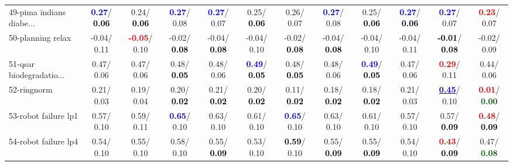 \begin{table}[h]
\begin{center}
{\begin{tabular}{lc|c|c|c|c|c|c|c|c|c|c}
49-pima indians diabe... & \textcolor{blue}{\textbf{  0.27}}/\textcolor{black}{\textbf{  0.06}} &   0.24/\textcolor{black}{\textbf{  0.06}} & \textcolor{blue}{\textbf{  0.27}}/  0.08 & \textcolor{blue}{\textbf{  0.27}}/  0.07 &   0.25/\textcolor{black}{\textbf{  0.06}} &   0.26/  0.07 & \textcolor{blue}{\textbf{  0.27}}/  0.08 &   0.25/\textcolor{black}{\textbf{  0.06}} & \textcolor{blue}{\textbf{  0.27}}/\textcolor{black}{\textbf{  0.06}} & \textcolor{blue}{\textbf{  0.27}}/  0.07 & \textcolor{red}{\textbf{  0.23}}/  0.07 \\
50-planning relax &  -0.04/  0.11 & \textcolor{red}{\textbf{ -0.05}}/  0.10 &  -0.02/\textcolor{black}{\textbf{  0.08}} &  -0.04/\textcolor{black}{\textbf{  0.08}} &  -0.04/  0.10 &  -0.02/\textcolor{black}{\textbf{  0.08}} &  -0.04/\textcolor{black}{\textbf{  0.08}} &  -0.04/  0.10 &  -0.04/  0.11 & \textcolor{black}{\textbf{ -0.01}}/\textcolor{black}{\textbf{  0.08}} &  -0.02/  0.09 \\
51-qsar biodegradatio... &   0.47/  0.06 &   0.47/  0.06 &   0.48/\textcolor{black}{\textbf{  0.05}} &   0.48/  0.06 & \textcolor{blue}{\textbf{  0.49}}/\textcolor{black}{\textbf{  0.05}} &   0.48/\textcolor{black}{\textbf{  0.05}} &   0.48/  0.06 & \textcolor{blue}{\textbf{  0.49}}/\textcolor{black}{\textbf{  0.05}} &   0.47/  0.06 & \textcolor{red}{\textbf{  0.29}}/  0.11 &   0.44/  0.06 \\
52-ringnorm &   0.21/  0.03 &   0.19/  0.04 &   0.20/\textcolor{black}{\textbf{  0.02}} &   0.21/\textcolor{black}{\textbf{  0.02}} &   0.20/\textcolor{black}{\textbf{  0.02}} &   0.11/\textcolor{black}{\textbf{  0.02}} &   0.18/\textcolor{black}{\textbf{  0.02}} &   0.18/\textcolor{black}{\textbf{  0.02}} &   0.21/  0.03 & \underline{\textcolor{blue}{\textbf{  0.45}}}/  0.10 & \textcolor{red}{\textbf{  0.01}}/\textcolor{darkgreen}{\textbf{  0.00}} \\
53-robot failure lp1 &   0.57/  0.10 &   0.59/  0.11 & \textcolor{blue}{\textbf{  0.65}}/  0.10 &   0.63/  0.10 &   0.61/  0.10 & \textcolor{blue}{\textbf{  0.65}}/  0.10 &   0.63/  0.10 &   0.61/  0.10 &   0.57/  0.10 &   0.57/\textcolor{black}{\textbf{  0.09}} & \textcolor{red}{\textbf{  0.48}}/\textcolor{black}{\textbf{  0.09}} \\ \hline
54-robot failure lp4 &   0.54/  0.10 &   0.55/  0.10 &   0.58/  0.10 &   0.55/\textcolor{black}{\textbf{  0.09}} &   0.53/  0.10 & \textcolor{black}{\textbf{  0.59}}/  0.10 &   0.55/\textcolor{black}{\textbf{  0.09}} &   0.55/\textcolor{black}{\textbf{  0.09}} &   0.54/  0.10 & \textcolor{red}{\textbf{  0.43}}/\textcolor{black}{\textbf{  0.09}} &   0.47/\textcolor{darkgreen}{\textbf{  0.08}} \\

\end{tabular}}
\end{center}
\end{table}
